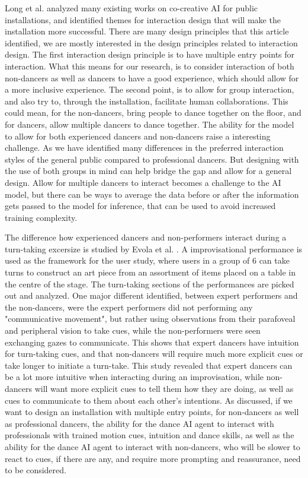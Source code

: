 \documentclass[final,5p,times,twocolumn,authoryear]{article}
\begin{document}
Long et al. analyzed many existing works on co-creative AI for public
installations, and identified themes for interaction design that will
make the installation more successful. There are many design principles
that this article identified, we are mostly interested in the design
principles related to interaction design. The first interaction design
principle is to have multiple entry points for interaction. What this
means for our research, is to consider interaction of both non-dancers
as well as dancers to have a good experience, which should allow for a
more inclusive experience. The second point, is to allow for group
interaction, and also try to, through the installation, facilitate human
collaborations. This could mean, for the non-dancers, bring people to
dance together on the floor, and for dancers, allow multiple dancers to
dance together. The ability for the model to allow for both experienced
dancers and non-dancers raise a interesting challenge. As we have
identified many differences in the preferred interaction styles of the
general public compared to professional dancers. But designing with the
use of both groups in mind can help bridge the gap and allow for a
general design. Allow for multiple dancers to interact becomes a
challenge to the AI model, but there can be ways to average the data
before or after the information gets passed to the model for inference,
that can be used to avoid increased training complexity.

The difference how experienced dancers and non-performers interact
during a turn-taking excersize is studied by Evola et al. \cite{Evola}. 
A improvisational performance is used as the framework for the user
study, where users in a group of 6 can take turns to construct an art
piece from an assortment of items placed on a table in the centre of the
stage. The turn-taking sections of the performances are picked out and analyzed.
One major different identified, between expert performers and the
non-dancers, were the expert performers did not performing any "communicative
movement", but rather using observations from their parafoveal and peripheral
vision to take cues, while the non-performers were seen exchanging gazes to
communicate. This shows that expert dancers have intuition for
turn-taking cues, and that non-dancers will require much more explicit cues
or take longer to initiate a turn-take. This study revealed that expert
dancers can be a lot more intuitive when interacting during
an improvisation, while non-dancers will want more explicit cues to tell
them how they are doing, as well as cues to communicate to them about
each other's intentions. As discussed, if we want to design an
installation with multiple entry points, for non-dancers as well as
professional dancers, the ability for the dance AI agent to interact
with professionals with trained motion cues, intuition and dance skills,
as well as the ability for the dance AI agent to interact with
non-dancers, who will be slower to react to cues, if there are any, and
require more prompting and reassurance, need to be considered.
\end{document}
